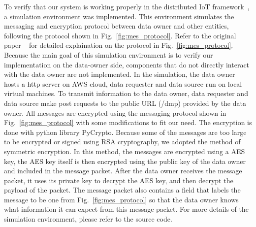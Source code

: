 To verify that our system is working properly in the distributed IoT framework~\cite{campbell}, a simulation environment was implemented. This environment simulates the messaging and encryption protocol between data owner and other entities, following the protocol shown in Fig.~\ref{fig:mes_protocol}. Refer to the original paper ~\cite{campbell} for detailed explaination on the protocol in Fig.~\ref{fig:mes_protocol}. Because the main goal of this simulation environment is to verify our implementation on the data-owner side, components that do not directly interact with the data owner are not implemented. 
In the simulation, the data owner hosts a http server on AWS cloud, data requester and data source run on local virtual machines. To transmit information to the data owner, data requester and data source make post requests to the public URL (/dmp) provided by the data owner. All messages are encrypted using the messaging protocol shown in Fig.~\ref{fig:mes_protocol} with some modifications to fit our need. The encryption is done with python library PyCrypto. Because some of the messages are too large to be encrypted or signed using RSA cryptography, we adopted the method of symmetric encryption. In this method, the messages are encrypted using a AES key, the AES key itself is then encrypted using the public key of the data owner and included in the message packet. After the data owner receives the message packet, it uses its private key to decrypt the AES key, and then decrypt the payload of the packet. The message packet also contains a field that labels the message to be one from Fig.~\ref{fig:mes_protocol} so that the data owner knows what information it can expect from this message packet. For more details of the simulation environment, please refer to the source code.
